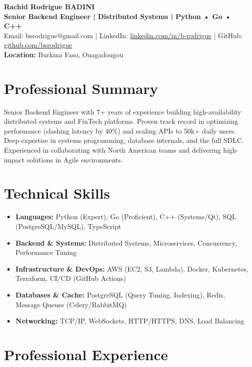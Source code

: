 \documentclass[a4paper,10pt]{article}
\begin{document}
\begin{center}
    {\LARGE\bfseries Rachid Rodrigue BADINI} \\[0.15cm]
    \textbf{Senior Backend Engineer | Distributed Systems | Python • Go • C++} \\
    Email: bsrodrigue@gmail.com | LinkedIn: \href{https://linkedin.com/in/b-rodrigue}{linkedin.com/in/b-rodrigue} | GitHub: \href{https://github.com/bsrodrigue}{github.com/bsrodrigue} \\
    \textbf{Location:} Burkina Faso, Ouagadougou
\end{center}

\vspace{0.1cm}

\section*{Professional Summary}
Senior Backend Engineer with 7+ years of experience building high-availability distributed systems and FinTech platforms. Proven track record in optimizing performance (slashing latency by 40\%) and scaling APIs to 50k+ daily users. Deep expertise in systems programming, database internals, and the full SDLC. Experienced in collaborating with North American teams and delivering high-impact solutions in Agile environments.

\section*{Technical Skills}
\begin{itemize}[leftmargin=*,nosep]
    \item \textbf{Languages:} Python (Expert), Go (Proficient), C++ (Systems/Qt), SQL (PostgreSQL/MySQL), TypeScript
    \item \textbf{Backend \& Systems:} Distributed Systems, Microservices, Concurrency, Performance Tuning
    \item \textbf{Infrastructure \& DevOps:} AWS (EC2, S3, Lambda), Docker, Kubernetes, Terraform, CI/CD (GitHub Actions)
    \item \textbf{Databases \& Cache:} PostgreSQL (Query Tuning, Indexing), Redis, Message Queues (Celery/RabbitMQ)
    \item \textbf{Networking:} TCP/IP, WebSockets, HTTP/HTTPS, DNS, Load Balancing
\end{itemize}

\section*{Professional Experience}
\end{document}
